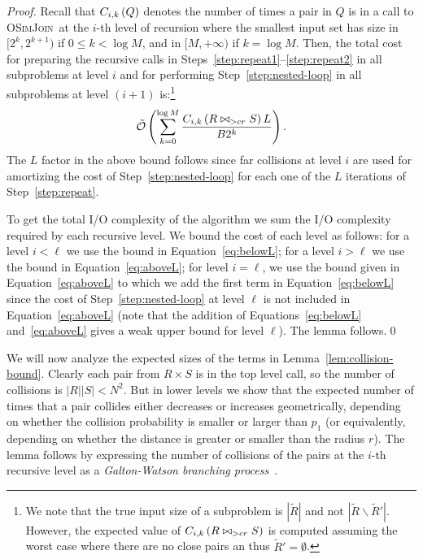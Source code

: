\documentclass{llncs}
\newcommand{\Osymbol}{{\mathcal O}}
\newcommand{\TO}[1]{\tilde{\Osymbol}\left(#1\right)}
\newcommand{\SimJoin}{\textsc{OSimJoin}}
\begin{document}
\begin{proof}
Recall that $\C[i,k]{Q}$ denotes the number of times a pair in $Q$ is in a call to \SimJoin\ at the $i$-th level of recursion where the smallest input set has size in $[2^k, 2^{k+1})$ if $0\leq k <\log M$, and in $[M, +\infty)$ if $k = \log M$. 
Then, the total cost for preparing the recursive calls in Steps~\ref{step:repeat1}--\ref{step:repeat2} in all subproblems at level $i$ and for performing Step~\ref{step:nested-loop} in all subproblems at level $(i+1)$ is:\footnote{We note that the true input size of a subproblem is $|\tilde R|$
and not $|\tilde R\backslash \tilde R'|$. However, the expected value of $\C[i,k]{R \bowtie_{> cr} S}$ is computed assuming the worst case where there are no close pairs an thus $\tilde R'=\emptyset$.}
\begin{equation}\label{eq:aboveL}
\TO{\sum_{k=0}^{\log M}\frac{\C[i,k]{R \bowtie_{> cr} S} L}{B 2^k}}.
\end{equation}
The $L$ factor in the above bound follows since far collisions at level $i$ are used for amortizing the cost of Step~\ref{step:nested-loop} for each one of the $L$ iterations of Step~\ref{step:repeat}.

To get the total I/O complexity of the algorithm we sum the I/O complexity required by each recursive level. 
We bound the cost of each level as follows:
for a level $i<\ell$ we use the bound in Equation~\ref{eq:belowL}; 
for a level $i>\ell$ we use the bound in Equation~\ref{eq:aboveL}; 
for level $i=\ell$, we use the bound given in Equation~\ref{eq:aboveL} to which we add the first term in Equation~\ref{eq:belowL} since  the cost of
Step~\ref{step:nested-loop} at level $\ell$ is not included in Equation~\ref{eq:aboveL} (note that the addition of Equations~\ref{eq:belowL}
and~\ref{eq:aboveL} gives a weak upper bound for level $\ell$).
The lemma follows.\qed
\end{proof}


We will now analyze the expected sizes of the terms in Lemma~\ref{lem:collision-bound}. 
Clearly each pair from $R\times S$ is in the top level call, so the number of collisions is $|R||S| < N^2$. 
But in lower levels we show that the expected number of times that a pair collides either decreases or increases geometrically, depending on whether the collision probability is smaller or larger than $p_1$ (or equivalently, depending on whether the distance is greater or smaller than the radius $r$). 
The lemma follows by expressing the number of collisions of the pairs at the $i$-th recursive level as a \emph{Galton-Watson branching process}~\cite{harris2002theory}. 
\end{document}
